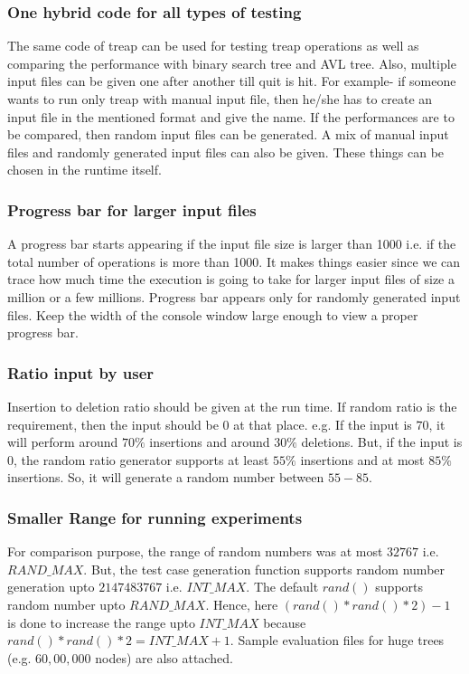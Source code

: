\documentclass{article}
\begin{document}
\subsubsection{One hybrid code for all types of testing}
The same code of treap can be used for testing treap operations as well as comparing the performance with binary search tree and AVL tree. Also, multiple input files can be given one after another till quit is hit. For example- if someone wants to run only treap with manual input file, then he/she has to create an input file in the mentioned format and give the name. If the performances are to be compared, then random input files can be generated. A mix of manual input files and randomly generated input files can also be given. These things can be chosen in the runtime itself.
\subsubsection{Progress bar for larger input files}
A progress bar starts appearing if the input file size is larger than 1000 i.e. if the total number of operations is more than 1000. It makes things easier since we can trace how much time the execution is going to take for larger input files of size a million or a few millions. Progress bar appears only for randomly generated input files. Keep the width of the console window large enough to view a proper progress bar.
\subsubsection{Ratio input by user}
Insertion to deletion ratio should be given at the run time. If random ratio is the requirement, then the input should be $0$ at that place. e.g. If the input is $70$, it will perform around $70\%$ insertions and around $30\%$ deletions. But, if the input is $0$, the random ratio generator supports at least $55\%$ insertions and at most $85\%$ insertions. So, it will generate a random number between $55-85$.
\subsubsection{Smaller Range for running experiments}
For comparison purpose, the range of random numbers was at most $32767$ i.e. $RAND\_MAX$. But, the test case generation function supports random number generation upto $2147483767$ i.e. $INT\_MAX$. The default $rand()$ supports random number upto $RAND\_MAX$. Hence, here $(rand()*rand()*2)-1$ is done to increase the range upto $INT\_MAX$ because $rand()*rand()*2 = INT\_MAX+1$. Sample evaluation files for huge trees (e.g. $60,00,000$ nodes) are also attached. 
\end{document}
